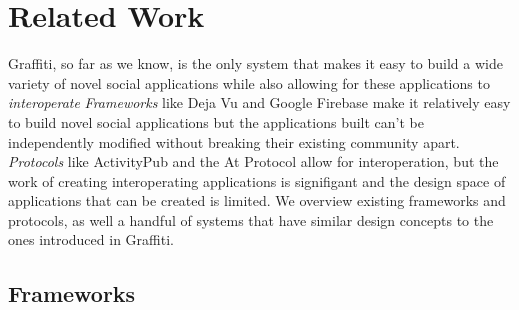\section{Related Work}

Graffiti, so far as we know, is the only system that makes it
easy to build a wide variety of novel social applications while
also allowing for these applications to \emph{interoperate}
\emph{Frameworks} like Deja Vu
and Google Firebase make it relatively easy to build novel
social applications but the applications built can't be
independently modified without breaking their existing community apart.
\emph{Protocols} like ActivityPub and the At Protocol allow for interoperation,
but the work of creating interoperating applications is signifigant
and the design space of applications that can be created is limited.
We overview existing frameworks and protocols, as well
a handful of systems that have similar design concepts
to the ones introduced in Graffiti.


\subsection{Frameworks}

